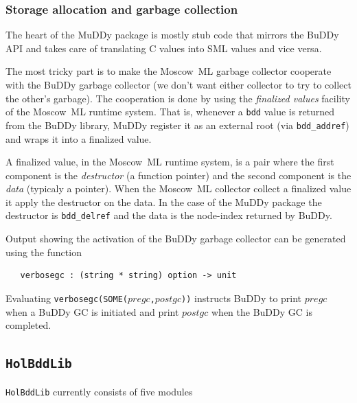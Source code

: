 \documentclass[12pt,fleqn]{book}
\renewcommand{\t}[1]{\mbox{\tt #1}}
\newcommand{\mosml}{Moscow~ML{}}
\newcommand{\Buddy}{BuDDy{}}
\newcommand{\Muddy}{MuDDy{}}
\begin{document}
\subsubsection{Storage allocation and garbage collection}
\label{sec:technical-details}

The heart of the \Muddy{} package is mostly stub code that mirrors the
\Buddy{} API and takes care of translating C values into SML values and
vice versa.

The most tricky part is to make the \mosml{} garbage collector cooperate
with the \Buddy{} garbage collector (we don't want either collector to
try to collect the other's garbage).  The cooperation is done by using
the \emph{finalized values} facility of the \mosml{} runtime system.
That is, whenever a \texttt{bdd} value is returned from the \Buddy{}
library, \Muddy{} register it as an external root (via
\verb+bdd_addref+) and wraps it into a finalized value.  

A finalized value, in the \mosml{} runtime system, is a pair where the
first component is the \emph{destructor} (a function pointer) and the
second component is the \emph{data} (typicaly a pointer).  When the
\mosml{} collector collect a finalized value it apply the destructor on
the data.  In the case of the \Muddy{} package the destructor is
\verb+bdd_delref+ and the data is the node-index returned by \Buddy{}.

Output showing the activation of the \Buddy{} garbage collector can be generated
using the function

\begin{verbatim}
   verbosegc : (string * string) option -> unit
\end{verbatim}

Evaluating \t{verbosegc(SOME($pregc$,$postgc$))} instructs BuDDy to print
$pregc$ when a BuDDy GC is initiated and print $postgc$ when the
\Buddy{} GC is completed.

\subsection{\t{HolBddLib}}\label{HolBddLib}

\t{HolBddLib} currently consists of five modules
\end{document}

